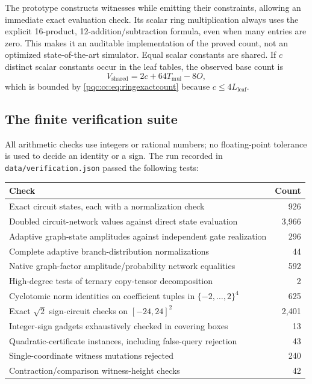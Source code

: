 \documentclass[11pt,letterpaper]{article}
\numberwithin{equation}{section}
\theoremstyle{definition}
\theoremstyle{remark}
\newcommand{\Lleaf}{L_{\mathrm{leaf}}}
\newcommand{\Tmul}{T_{\mathrm{mul}}}
\begin{document}
The prototype constructs witnesses while emitting their constraints, allowing
an immediate exact evaluation check. Its scalar ring multiplication always uses
the explicit 16-product, 12-addition/subtraction formula, even when many entries
are zero. This makes it an auditable implementation of the proved count, not
an optimized state-of-the-art simulator. Equal scalar constants are shared.
If $c$ distinct scalar constants occur in the leaf tables, the observed base
count is
\begin{equation}
 V_{\mathrm{shared}}=2c+64\Tmul-8O,
\label{pqc:cc:eq:sharedcount}
\end{equation}
which is bounded by \eqref{pqc:cc:eq:ringexactcount} because $c\le4\Lleaf$.

\subsection{The finite verification suite}

All arithmetic checks use integers or rational numbers; no floating-point
tolerance is used to decide an identity or a sign. The run recorded in
\texttt{data/verification.json} passed the following tests:
\begin{center}
\begin{tabular}{@{}p{4.9in}r@{}}
\toprule
Check & Count\\
\midrule
Exact circuit states, each with a normalization check & 926\\
Doubled circuit-network values against direct state evaluation & 3,966\\
Adaptive graph-state amplitudes against independent gate realization & 296\\
Complete adaptive branch-distribution normalizations & 44\\
Native graph-factor amplitude/probability network equalities & 592\\
High-degree tests of ternary copy-tensor decomposition & 2\\
Cyclotomic norm identities on coefficient tuples in $\{-2,\ldots,2\}^4$ & 625\\
Exact $\sqrt2$ sign-circuit checks on $[-24,24]^2$ & 2,401\\
Integer-sign gadgets exhaustively checked in covering boxes & 13\\
Quadratic-certificate instances, including false-query rejection & 43\\
Single-coordinate witness mutations rejected & 240\\
Contraction/comparison witness-height checks & 42\\
\bottomrule
\end{tabular}
\end{center}
\end{document}
